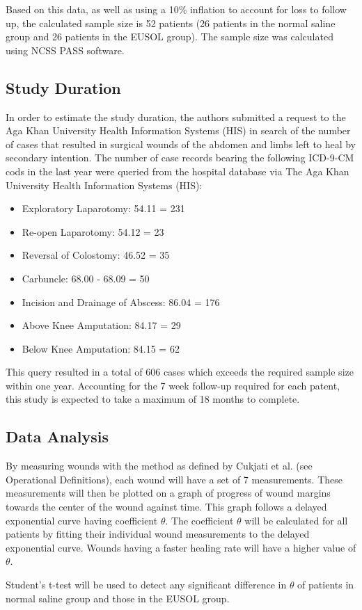 \documentclass{article}
\begin{document}
Based on this data, as well as using a 10\% inflation to account for loss to
follow up, the calculated sample size is 52 patients (26 patients in the normal
saline group and 26 patients in the EUSOL group). The sample size was calculated
using NCSS PASS software.

\subsection{Study Duration}
In order to estimate the study duration, the authors submitted a request to the
Aga Khan University Health Information Systems (HIS) in search of the number of
cases that resulted in surgical wounds of the abdomen and limbs left to heal by
secondary intention. The number of case records bearing the following ICD-9-CM
cods in the last year were queried from the hospital database via The Aga Khan
University Health Information Systems (HIS):

\begin{itemize}
\item Exploratory Laparotomy: 54.11 = 231
\item Re-open Laparotomy: 54.12 = 23
\item Reversal of Colostomy: 46.52 = 35
\item Carbuncle: 68.00 - 68.09 = 50
\item Incision and Drainage of Abscess: 86.04 = 176
\item Above Knee Amputation: 84.17 = 29
\item Below Knee Amputation: 84.15 = 62
\end{itemize}

This query resulted in a total of 606 cases which exceeds the required sample
size within one year. Accounting for the 7 week follow-up required for each
patent, this study is expected to take a maximum of 18 months to complete.

\subsection{Data Analysis}
By measuring wounds with the method as defined by Cukjati et al. (see
Operational Definitions), each wound will have a set of 7 measurements. These
measurements will then be plotted on a graph of progress of wound margins
towards the center of the wound against time. This graph follows a delayed
exponential curve having coefficient $\theta$. The coefficient $\theta$ will be
calculated for all patients by fitting their individual wound measurements to
the delayed exponential curve. Wounds having a faster healing rate will have a
higher value of $\theta$.

Student's t-test will be used to detect any significant difference in $\theta$ of
patients in normal saline group and those in the EUSOL group.


\end{document}
